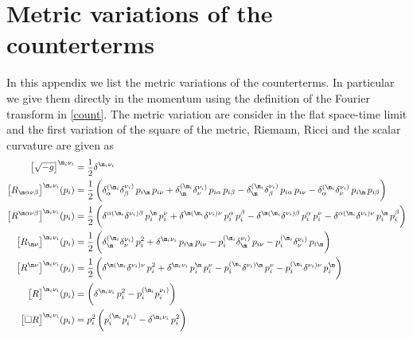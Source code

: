 \documentclass[a4paper,11pt,openright,twoside]{book}
\let\a=\alpha   \let\b=\beta   \let\g=\gamma   \let\d=\delta
\let\n=\nu      \let\x=\xi     \let\p=\pi      \let\r=\rho
\newcommand{\sdfrac}[2]{\mbox{\small$\displaystyle\frac{#1}{#2}$}}
\numberwithin{equation}{section}
\begin{document}
{{\section{Metric variations of the counterterms}\label{Mvc}
In this appendix we list the metric variations of the counterterms. In particular we give them directly in the momentum using the definition of the Fourier transform in \eqref{count}. The metric variation are consider in the flat space-time limit and the first variation of the square of the metric, Riemann, Ricci and the scalar curvature are given as
\begin{align}
	\big[\sqrt{-g}\big]^{\m_i\n_i}&=\sdfrac{1}{2}\d^{\m_i\n_i}\\
	\big[R_{\m\a\n\b}\big]^{\m_i\n_i}(p_i)&=\frac{1}{2}\,\bigg(\d_\a^{(\m_i}\d^{\n_i)}_\b\,p_{i\m}\,p_{i\n}
	+\d_\m^{(\m_i}\d^{\n_i)}_\n\,p_{i\a}\,p_{i\b}-\d_\m^{(\m_i}\d^{\n_i)}_\b\,p_{i\a}\,p_{i\n}-\d_\a^{(\m_i}\d^{\n_i)}_\n\,p_{i\m}\,p_{i\b}\bigg)\\
	\big[R^{\m\a\n\b}\big]^{\m_i\n_i}(p_i)&=\frac{1}{2}\,\bigg(\d^{\a(\m_i}\d^{\n_i)\b}\,p_i^\m\,p_i^\n
	+\d^{\m(\m_i}\d^{\n_i)\n}\,p_i^\a\,p_i^\b-\d^{\m(\m_i}\d^{\n_i)\b}\,p_i^\a\,p_i^\n-\d^{\a(\m_i}\d^{\n_i)\n}\,p_i^\m\,p_i^\b\bigg)\\
	\big[R_{\m\n}\big]^{\m_i\n_i}(p_i)&=\frac{1}{2}\,\bigg(\d_\m^{(\m_i}\d^{\n_i)}_\n\,p_{i}^2
	+\d^{\m_i\n_i}\,p_{i\m}\,p_{i\n}-p_i^{(\m_i}\d^{\n_i)}_\m\,p_{i\n}-p_i^{(\m_i}\d^{\n_i)}_\n\,p_{i\m}\bigg)\\
	\big[R^{\m\n}\big]^{\m_i\n_i}(p_i)&=\frac{1}{2}\,\bigg(\d^{\m(\m_i}\d^{\n_i)\n}\,p_{i}^2
	+\d^{\m_i\n_i}\,p_i^\m\,p_i^\n-p_i^{(\m_i}\d^{\n_i)\m}\,p_i^\n-p_i^{(\m_i}\d^{\n_i)\n}\,p_i^\m\bigg)\\
	\big[R\big]^{\m_i\n_i}(p_i)&=\bigg(\d^{\m_i\n_i}\,p_{i}^2-p_i^{(\m_i}p_i^{\n_i)}\bigg)\\
	\big[\square R\big]^{\m_i\n_i}(p_i)&=p_i^2\,\bigg(p_i^{(\m_i}p_i^{\n_i)}-\d^{\m_i\n_i}\,p_{i}^2\bigg)
\end{align}
}}
\end{document}
